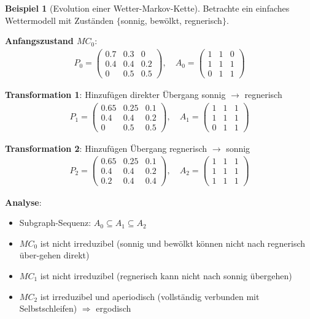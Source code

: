 \documentclass[a4paper,12pt]{article}
\theoremstyle{definition}
\newtheorem{beispiel}{Beispiel}
\begin{document}
\begin{beispiel}[Evolution einer Wetter-Markov-Kette]
	Betrachte ein einfaches Wettermodell mit Zuständen $\{$sonnig, bewölkt, regnerisch$\}$.
	
	\textbf{Anfangszustand $MC_0$}:
	\begin{align*}
		P_0 = \begin{pmatrix}
			0.7 & 0.3 & 0 \\
			0.4 & 0.4 & 0.2 \\
			0 & 0.5 & 0.5
		\end{pmatrix}, \quad
		A_0 = \begin{pmatrix}
			1 & 1 & 0 \\
			1 & 1 & 1 \\
			0 & 1 & 1
		\end{pmatrix}
	\end{align*}
	
	\textbf{Transformation 1}: Hinzufügen direkter Übergang sonnig $\rightarrow$ regnerisch
	\begin{align*}
		P_1 = \begin{pmatrix}
			0.65 & 0.25 & 0.1 \\
			0.4 & 0.4 & 0.2 \\
			0 & 0.5 & 0.5
		\end{pmatrix}, \quad
		A_1 = \begin{pmatrix}
			1 & 1 & 1 \\
			1 & 1 & 1 \\
			0 & 1 & 1
		\end{pmatrix}
	\end{align*}
	
	\textbf{Transformation 2}: Hinzufügen Übergang regnerisch $\rightarrow$ sonnig
	\begin{align*}
		P_2 = \begin{pmatrix}
			0.65 & 0.25 & 0.1 \\
			0.4 & 0.4 & 0.2 \\
			0.2 & 0.4 & 0.4
		\end{pmatrix}, \quad
		A_2 = \begin{pmatrix}
			1 & 1 & 1 \\
			1 & 1 & 1 \\
			1 & 1 & 1
		\end{pmatrix}
	\end{align*}
	
	\textbf{Analyse}:
	\begin{itemize}
		\item[-] Subgraph-Sequenz: $A_0 \subseteq A_1 \subseteq A_2$
		\item[-] $MC_0$ ist nicht irreduzibel (sonnig und bewölkt können nicht nach regnerisch über-gehen direkt)
		\item[-] $MC_1$ ist nicht irreduzibel (regnerisch kann nicht nach sonnig übergehen)
		\item[-] $MC_2$ ist irreduzibel und aperiodisch (vollständig verbunden mit Selbstschleifen) $\Rightarrow$ ergodisch
	\end{itemize}
	

\end{beispiel}
\end{document}
